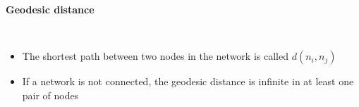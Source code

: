 \documentclass[8pt]{beamer}
\begin{document}
\begin{frame}
\frametitle{\insertsection}
\framesubtitle{Geodesic distance}

\begin{columns}[c]
\begin{itemize}
	\item The shortest path between two nodes in the network is called {\color{blue}{geodesic distance}} $d(n_i, n_j)$
	\item If a network is not connected, the geodesic distance is infinite in at least one pair of nodes
\end{itemize}

\centering
{}


\end{columns}

\end{frame}
\end{document}
